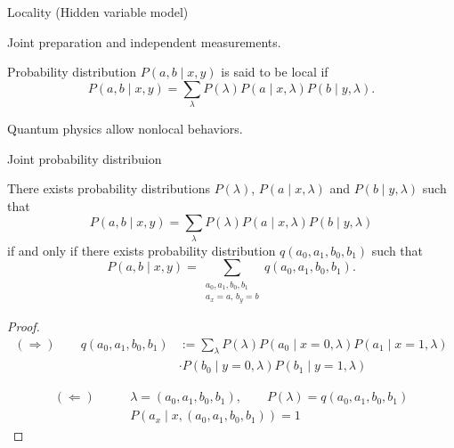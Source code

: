 \documentclass{beamer}
\newcommand\emm[1]{\textcolor{redorange}{{#1}}}
\begin{document}
\begin{frame}{Locality (Hidden variable model)}
\begin{center}
Joint preparation and independent measurements.
\end{center}
Probability distribution $P(a,b\mid x,y)$ is said to be \emm{local} if
\begin{equation*}
P(a, b\mid x,y) = \sum_{\lambda} P(\lambda) P(a\mid x, \lambda) P(b\mid y,\lambda).
\end{equation*}
\vspace{2em}
\begin{center}
Quantum physics allow \emm{nonlocal} behaviors.
\end{center}
\end{frame}

\begin{frame}{Joint probability distribuion}
\small
\begin{lemma}
There exists probability distributions $P(\lambda)$, $P(a\mid x,\lambda)$ and $P(b\mid y,\lambda)$ such that
\begin{equation*}
P(a, b\mid x,y) = \sum_{\lambda} P(\lambda) P(a\mid x, \lambda) P(b\mid y,\lambda)
\end{equation*}
if and only if there exists probability distribution $q(a_0,a_1,b_0,b_1)$ such that
\begin{equation*}
P(a, b\mid x,y) = \sum_{\substack{a_0,a_1,b_0,b_1\\a_x = a,\, b_y = b}} q(a_0, a_1, b_0, b_1).
\end{equation*}
\end{lemma}

\vspace{-2em}
\begin{proof}
\vspace{-2em}
\begin{align*}
(\Rightarrow)\qquad
q(a_0,a_1,b_0,b_1) &:= \sum_{\lambda}P(\lambda) P(a_0\mid x=0, \lambda) P(a_1\mid x=1, \lambda)\\
&\cdot P(b_0\mid y=0, \lambda) P(b_1\mid y=1, \lambda)
\end{align*}

\vspace{-2em}
\begin{align*}
(\Leftarrow)\qquad
&\lambda = (a_0, a_1, b_0, b_1), \qquad P(\lambda) = q(a_0,a_1,b_0,b_1)\\
&P(a_x\mid x,(a_0, a_1, b_0, b_1)) = 1
\end{align*}
\end{proof}
\end{frame}
\end{document}

